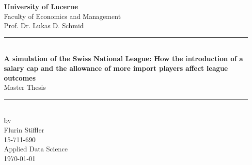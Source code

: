 \begin{titlepage}
    
  \begin{center}

    \huge \textbf{University of Lucerne}\\
    \LARGE Faculty of Economics and Management\\
    \LARGE Prof. Dr. Lukas D. Schmid\\
    \vfill
    \rule{\linewidth}{2pt}\\
    \vspace{0.5 cm}
    \Huge \textbf{A simulation of the Swiss National League: How the introduction of a salary cap and the allowance of more import players affect league outcomes}\\
    \vspace{0.5cm}
    \Huge Master Thesis\\
    \rule{\linewidth}{2pt}\\
    \vfill
    \Large by\\
    \vspace{0.5cm}
    \Large Flurin Stiffler\\
    \Large 15-711-690\\
    \Large Applied Data Science\\
    \Large \today

  \end{center}
\end{titlepage}
